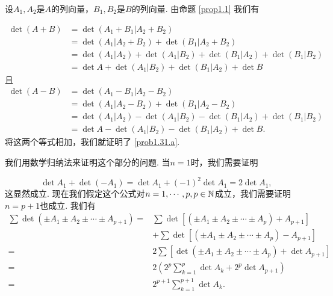 \begin{solution}
  \begin{enuma}
    \item 设$A_1,A_2$是$A$的列向量，$B_1,B_2$是$B$的列向量. 由命题 \ref{prop1.1} 我们有
  \end{enuma}
  \begin{align*}
    \det (A + B) & = \det (A_1 + B_1|A_2 + B_2) \\
    & = \det(A_1|A_2 + B_2) + \det (B_1|A_2 + B_2) \\
    & = \det(A_1|A_2) + \det(A_1|B_2) + \det(B_1|A_2) + \det(B_1|B_2) \\
    & = \det A + \det(A_1|B_2) + \det(B_1|A_2) + \det B
  \end{align*}
  且
  \begin{align*}
    \det (A - B) & = \det (A_1 - B_1|A_2 - B_2) \\
    & = \det(A_1|A_2 - B_2) + \det (B_1|A_2 - B_2) \\
    & = \det(A_1|A_2) - \det(A_1|B_2) - \det(B_1|A_2) + \det(B_1|B_2) \\
    & = \det A - \det(A_1|B_2) - \det(B_1|A_2) + \det B.
  \end{align*}
  将这两个等式相加，我们就证明了 \ref{prob1.31.a}.

  \begin{enuma}\setcounter{enumi}{1}
    \item 我们用数学归纳法来证明这个部分的问题. 当$n=1$时，我们需要证明
  \end{enuma}
   \[
     \det A_1 +\det (-A_1)=\det A_1+(-1)^2\det A_1=2\det A_1,
   \]
   这显然成立. 现在我们假定这个公式对$n=1,\cdots,p,p\in\mathbb N$成立，我们需要证明$n=p+1$也成立. 我们有
  \begin{align*}
    \sum \det (\pm A_1\pm A_2\pm\cdots\pm A_{p+1})
     = {}& \sum \det\left[ (\pm A_1\pm A_2\pm\cdots \pm A_p) + A_{p+1} \right]\\
     & + \sum\det\left[
      (\pm A_1\pm A_2\pm\cdots\pm A_p) - A_{p+1}
    \right] \\
      = {} & 2\sum\left[ \det(\pm A_1\pm A_2\pm\cdots\pm A_p) + \det A_{p+1} \right] \\
      = {} & 2\left( 2^p\sum_{k=1}^p\det A_k + 2^p \det A_{p+1} \right) \\
      = {} & 2^{p+1}\sum_{k=1}^{p+1}\det A_k.
  \end{align*}
\end{solution}

